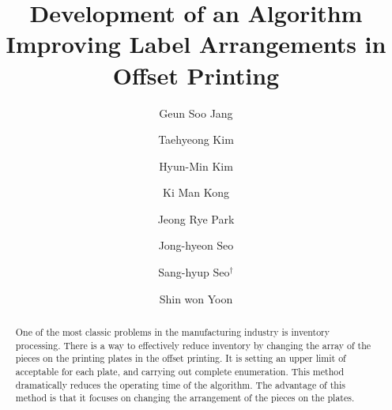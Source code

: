 \documentclass[a4paper]{amsart}
\title[Development of an Algorithm Improving Label Arrangements]{Development of an Algorithm Improving Label Arrangements in Offset Printing}
\author[G. S. Jang]{Geun Soo Jang}
\author[T. H. Kim]{Taehyeong Kim}
\author[H.-M. Kim]{Hyun-Min Kim}
\author[K. M. Kong]{Ki Man Kong}
\author[J. R. Park]{Jeong Rye Park}
\author[J.-H. Seo]{Jong-hyeon Seo}
\author[S.-H. Seo]{Sang-hyup Seo$^{\dagger}$}
\author[S. W. Yoon]{Shin won Yoon}
\numberwithin{equation}{section} %
\numberwithin{figure}{section} %
\numberwithin{table}{section}
\theoremstyle{plain}
\theoremstyle{definition}
\theoremstyle{plain}
\theoremstyle{plain}
\theoremstyle{plain}
\theoremstyle{plain}
\theoremstyle{plain}
\begin{document}
\begin{abstract}
One of the most classic problems in the manufacturing industry is inventory processing. 
There is a way to effectively reduce inventory by 
changing the array of the pieces on the printing plates in the offset printing. 
It is setting an upper limit of acceptable for each plate, and carrying out complete enumeration. 
This method dramatically reduces the operating time of the algorithm. 
The advantage of this method is that it focuses on changing the arrangement of the pieces on the plates.
\end{abstract}

\maketitle

\end{document}
